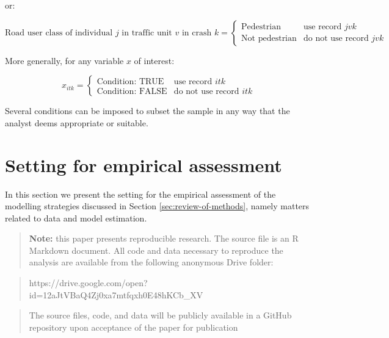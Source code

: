 \documentclass[]{elsarticle} %
\begin{document}
\noindent or:

\begin{equation}
\label{eq:sampling-pedestrian-opponent}
\text{Road user class of individual } j \text{ in traffic unit } v \text{ in crash } k = 
\begin{cases}
\text{Pedestrian} & \text{use record } jvk\\
\text{Not pedestrian} & \text{do not use record } jvk
\end{cases}
\end{equation}

More generally, for any variable \(x\) of interest:

\begin{equation}
\label{eq:sampling-general}
x_{itk} = 
\begin{cases}
\text{Condition: TRUE} & \text{use record } itk\\
\text{Condition: FALSE} & \text{do not use record } itk
\end{cases}
\end{equation}

Several conditions can be imposed to subset the sample in any way that
the analyst deems appropriate or suitable.

\hypertarget{sec:application}{%
\section{Setting for empirical assessment}\label{sec:application}}

In this section we present the setting for the empirical assessment of
the modelling strategies discussed in Section
\ref{sec:review-of-methods}, namely matters related to data and model
estimation.

\begin{quote}
\textbf{Note:} this paper presents reproducible research. The source
file is an R Markdown document. All code and data necessary to reproduce
the analysis are available from the following anonymous Drive folder:
\end{quote}

\begin{quote}
https://drive.google.com/open?id=12aJtVBaQ4Zj0xa7mtfqxh0E48hKCb\_XV
\end{quote}

\begin{quote}
The source files, code, and data will be publicly available in a GitHub
repository upon acceptance of the paper for publication
\end{quote}
\end{document}
